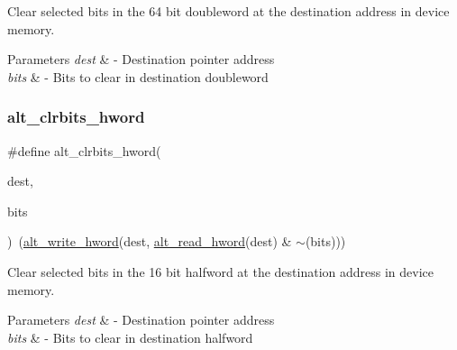 Clear selected bits in the 64 bit doubleword at the destination address in device memory. 
\begin{DoxyParams}{Parameters}
{\em dest} & -\/ Destination pointer address \\
\hline
{\em bits} & -\/ Bits to clear in destination doubleword \\
\hline
\end{DoxyParams}
\mbox{\label{group__ALT__SOCAL__UTIL__SC__FUNC_ga7f52b3995901cf84b0247746f51c3f13}} 
\subsubsection{\texorpdfstring{alt\_clrbits\_hword}{alt\_clrbits\_hword}}
{\footnotesize\ttfamily \#define alt\+\_\+clrbits\+\_\+hword(\begin{DoxyParamCaption}\item[{}]{dest,  }\item[{}]{bits }\end{DoxyParamCaption})~(\mbox{\hyperlink{group__ALT__SOCAL__UTIL__RW__FUNC_ga68370263143f2bbcae44530837772f50}{alt\+\_\+write\+\_\+hword}}(dest, \mbox{\hyperlink{group__ALT__SOCAL__UTIL__RW__FUNC_gaae69946769b67a9b8bf4f57143b1c4d7}{alt\+\_\+read\+\_\+hword}}(dest) \& $\sim$(bits)))}

Clear selected bits in the 16 bit halfword at the destination address in device memory. 
\begin{DoxyParams}{Parameters}
{\em dest} & -\/ Destination pointer address \\
\hline
{\em bits} & -\/ Bits to clear in destination halfword \\
\hline
\end{DoxyParams}
\mbox{\label{group__ALT__SOCAL__UTIL__SC__FUNC_ga41dfcdb447a751fa7fe3ba0fc91d7e93}} 
